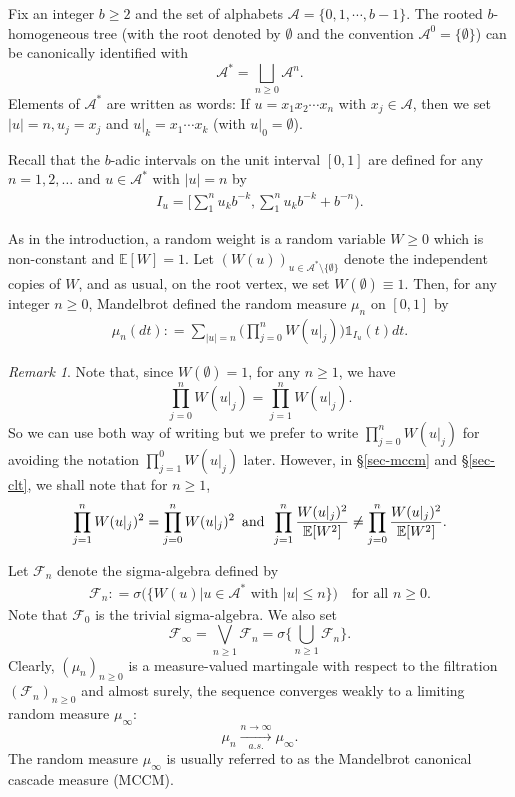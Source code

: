 \documentclass[12pt]{amsart}
\theoremstyle{definition}
\theoremstyle{remark}
\newtheorem*{remark*}{Remark}
\newcommand{\E}{\mathbb{E}}
\newcommand{\Ab}{\mathcal{A}}
\newcommand{\an}{\text{\, and \,}}
\newcommand{\indi}{\mathds{1}}
\numberwithin{equation}{section}
\begin{document}
Fix an integer $b \ge 2$ and the set    of alphabets $\Ab= \{0, 1, \cdots, b-1\}$.  The rooted $b$-homogeneous tree (with the root denoted by $\emptyset$ and the convention $\Ab^0 = \{\emptyset\}$) can be canonically identified with  
\[
\Ab^* = \bigsqcup_{n\ge 0}\Ab^n.
\] 
 Elements of $\Ab^*$ are written as words: If $u= x_1x_2\cdots x_n$ with $x_j\in \Ab$, then we set $|u| = n, u_j = x_j$ and $u|_k= x_1\cdots x_k$ (with $u|_0=\emptyset$).  


 





Recall that the $b$-adic intervals  on the unit interval  $[0, 1]$ are defined  for any $n =1, 2, \dots$ and $u\in \Ab^*$ with $|u|=n$ by
\begin{align}\label{def-Iu}
I_u = \Big[\sum_1^n u_k b^{-k},  \sum_1^n u_k b^{-k} + b^{-n} \Big).
\end{align}


As in the introduction,   a random weight  is a  random variable $W \ge 0$  which is non-constant and  $\E[W]=1$. Let $(W(u))_{u\in \Ab^*\setminus \{\emptyset\}}$ denote the  independent copies of $W$,  and as usual, on the root vertex, we set $W(\emptyset) \equiv 1$.  Then, for any  integer $n\ge 0$,  Mandelbrot \cite{M74} defined the random measure  $\mu_n$ on $[0,1]$ by 
\begin{align}\label{def-Lebn}
\mu_n (dt): = \sum_{|u|=n} \Big(\prod_{j=0}^n W(u|_j) \Big) \indi_{I_u} (t)dt. 
\end{align}
\begin{remark*}
Note that, since  $W(\emptyset)=1$, for any $n\ge 1$, we have 
\[
\prod_{j=0}^n W(u|_j) = \prod_{j=1}^n W(u|_j). 
\]
So we can use both way of writing but we prefer to write $\prod_{j=0}^n W(u|_j)$ for avoiding the notation $\prod_{j=1}^0 W(u|_j)$ later.  However, in  \S \ref{sec-mccm} and  \S \ref{sec-clt}, we shall note that for $n\ge 1$, 
\[ 
 \prod_{j=1}^{n} W(u|_j)^2 =  \prod_{j=0}^{n} W(u|_j)^2 \an  \prod_{j=1}^{n} \frac{W(u|_j)^2}{\E[W^2]} \ne \prod_{j=0}^{n} \frac{W(u|_j)^2}{\E[W^2]}. 
\]
\end{remark*}

 Let $\mathscr{F}_n$ denote the sigma-algebra defined by 
\begin{align}\label{def-fil-F}
\mathscr{F}_n: = \sigma\Big(\Big\{ W(u)\Big| \text{$u\in \Ab^*$ with $|u|\le n$}\Big\}\Big) \quad \text{for all $n\ge 0$}. 
\end{align}
Note that $\mathscr{F}_0$ is the trivial sigma-algebra.  We also set
\[
\mathscr{F}_\infty= \bigvee_{n\ge 1} \mathscr{F}_n =   \sigma\Big\{\bigcup_{n\ge 1} \mathscr{F}_n\Big\}.
\]
Clearly,  $(\mu_n)_{n\ge 0}$ is a measure-valued martingale with respect to the filtration $(\mathscr{F}_n)_{n \ge 0}$ and almost surely, the sequence converges weakly to a limiting random measure $\mu_\infty$: 
\[
\mu_n \xrightarrow[a.s.]{n\to\infty}\mu_\infty. 
\]
The random measure $\mu_\infty$ is usually referred to as the Mandelbrot canonical cascade measure (MCCM). 
\end{document}
